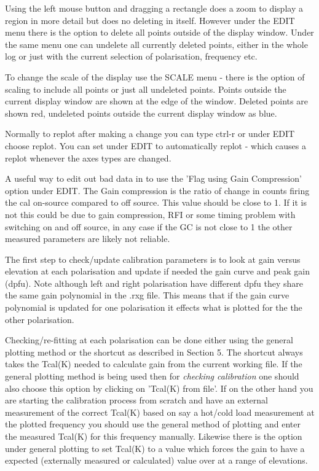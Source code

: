 Using the  left mouse button and dragging a rectangle does a zoom 
to display a region in more detail but does no deleting in itself. However 
under the EDIT menu there is the option to delete all points outside
of the display window. Under the same menu one can undelete all 
currently deleted points, either in the whole log or just with the current 
selection of polarisation, frequency etc.  

To change the scale of the display 
use the SCALE menu - there is the option of scaling to include all 
points or just all undeleted points. Points outside the current 
display window are shown at the edge of the window. Deleted points
are shown red, undeleted points outside the current display window
as blue. 

Normally to replot after making a change you can type ctrl-r or 
under EDIT choose replot. You can set under EDIT to automatically 
replot - which causes a replot whenever the axes types are changed.


A useful way to edit out bad data in to use the 'Flag using Gain Compression'
option under EDIT. The Gain compression is the ratio of change in counts
firing the  cal on-source compared to off source. This value should be 
close to 1. If it is not this could be due to gain compression, RFI 
or some timing problem with switching on and off source, in any case 
if the GC is not close to 1 the other measured parameters are likely not 
reliable. 


\vskip 1cm


\vskip 0.5cm

The first step to check/update calibration parameters is to look 
at gain versus elevation at each polarisation and update if needed
the gain curve and peak gain (dpfu).  Note although left and right 
polarisation have different dpfu they share the same gain polynomial in 
the .rxg file. This means that if the gain curve 
polynomial is updated for one polarisation it effects what is 
plotted for the the other polarisation.


Checking/re-fitting at each polarisation can be 
done either using the general plotting 
method or the shortcut as described in Section 5.
The shortcut always takes the Tcal(K) needed to calculate gain from the 
current working file. 
If the general plotting method is being used then for {\it checking 
calibration}  one should also choose this option by clicking on  
'Tcal(K) from file'. If on the other hand you are 
starting the  calibration process from scratch and have an external 
measurement of the correct Tcal(K) based on say a hot/cold load 
measurement at the plotted  frequency you should use the general 
method of plotting and enter the measured Tcal(K) for this frequency 
manually. Likewise there
is the option under  general plotting to set Tcal(K) to a value 
which forces the gain to have a  expected (externally measured or 
calculated)  value over at a range of elevations.


